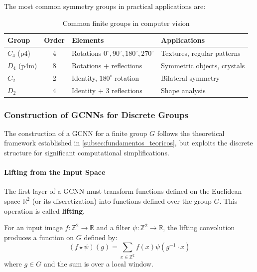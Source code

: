 The most common symmetry groups in practical applications are:

\begin{table}[h]
\centering
\begin{tabular}{|l|c|l|l|}
\hline
\textbf{Group} & \textbf{Order} & \textbf{Elements} & \textbf{Applications} \\
\hline
$C_4$ (p4) & 4 & Rotations $0^\circ, 90^\circ, 180^\circ, 270^\circ$ & Textures, regular patterns \\
$D_4$ (p4m) & 8 & Rotations + reflections & Symmetric objects, crystals \\
$C_2$ & 2 & Identity, $180^\circ$ rotation & Bilateral symmetry \\
$D_2$ & 4 & Identity + 3 reflections & Shape analysis \\
\hline
\end{tabular}
\caption{Common finite groups in computer vision}
\label{tab:grupos_finitos}
\end{table}

\subsubsection[Construction of GCNNs for Discrete Groups]{Construction of \glspl{GCNN} for Discrete Groups}

The construction of a \gls{GCNN} for a finite group $G$ follows the theoretical framework established in \autoref{subsec:fundamentos_teoricos}, but exploits the discrete structure for significant computational simplifications.

\paragraph{Lifting from the Input Space}

The first layer of a \gls{GCNN} must transform functions defined on the Euclidean space $\mathbb{R}^2$ (or its discretization) into functions defined over the group $G$. This operation is called \textbf{lifting}.

\begin{definition}
For an input image $f: \mathbb{Z}^2 \to \mathbb{R}$ and a filter $\psi: \mathbb{Z}^2 \to \mathbb{R}$, the lifting convolution produces a function on $G$ defined by:
\begin{equation}
(f \star \psi)(g) = \sum_{x \in \mathbb{Z}^2} f(x) \psi(g^{-1} \cdot x)
\label{eq:lifting_convolution}
\end{equation}
where $g \in G$ and the sum is over a local window.
\end{definition}


